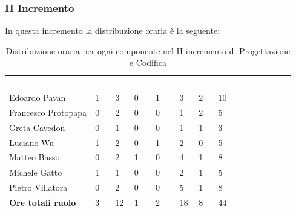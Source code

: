 \subsubsection{II Incremento}
In questa incremento la distribuzione oraria è la seguente:
\begin{table}[H]
\begin{center}
\renewcommand{\arraystretch}{1.25}
\begin{tabular}{ m{}<{\centering}  m{}<{\centering} m{}<{\centering} m{}<{\centering}  m{}<{\centering}  m{}<{\centering}  m{}<{\centering}  m{}<{\centering}   }
	\rowcolor{darkblue}
	\textcolor{white}{\textbf{Componente}} &\textcolor{white}{\textbf{Re}}&\textcolor{white}{\textbf{Pt}}&\textcolor{white}{\textbf{An}}&\textcolor{white}{\textbf{Am}}&\textcolor{white}{\textbf{Pr}}&\textcolor{white}{\textbf{Ve}}&\textcolor{white}{\textbf{Ore complessive}}\\ 
	Edoardo Pavan & 1 & 3 & 0 & 1 & 3 & 2 & 10 \\	
	
	Francesco Protopapa & 0 & 2 & 0 & 0 & 1 & 2 & 5 \\

	Greta Cavedon & 0 & 1 & 0 & 0 & 1 & 1 & 3 \\
	
	Luciano Wu & 1 & 2 & 0 & 1 & 2 & 0 & 5 \\
	
	Matteo Basso & 0 & 2 & 1 & 0 & 4 & 1 & 8 \\
	
	Michele Gatto & 1 & 1 & 0 & 0 & 2 & 1 & 5 \\
	
	Pietro Villatora & 0 & 2 & 0 & 0 & 5 & 1 & 8 \\
	
	\textbf{Ore totali ruolo} & 3 & 12 & 1 & 2 & 18 & 8 & 44 \\

\end{tabular}
\caption{Distribuzione oraria per ogni componente nel II incremento di Progettazione e Codifica}
\end{center}
\end{table}

